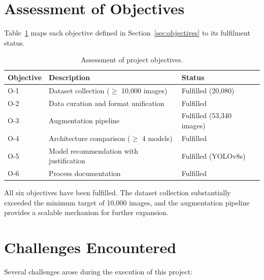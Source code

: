 \documentclass[a4paper,12pt,twoside]{report}
\begin{document}
\section{Assessment of Objectives}
\label{sec:objective-assessment}

Table~\ref{tab:objectives} maps each objective defined in
Section~\ref{sec:objectives} to its fulfilment status.

\begin{table}[htbp]
  \centering
  \caption{Assessment of project objectives.}
  \label{tab:objectives}
  \begin{tabularx}{\textwidth}{lXl}
    \toprule
    \textbf{Objective} & \textbf{Description} & \textbf{Status} \\
    \midrule
    O-1 & Dataset collection ($\geq$ 10{,}000 images) & Fulfilled (20{,}080) \\
    O-2 & Data curation and format unification & Fulfilled \\
    O-3 & Augmentation pipeline & Fulfilled (53{,}340 images) \\
    O-4 & Architecture comparison ($\geq$ 4 models) & Fulfilled \\
    O-5 & Model recommendation with justification & Fulfilled (YOLOv8s) \\
    O-6 & Process documentation & Fulfilled \\
    \bottomrule
  \end{tabularx}
\end{table}

All six objectives have been fulfilled. The dataset collection substantially
exceeded the minimum target of 10,000 images, and the augmentation pipeline
provides a scalable mechanism for further expansion.

\section{Challenges Encountered}
\label{sec:challenges}

Several challenges arose during the execution of this project:
\end{document}
